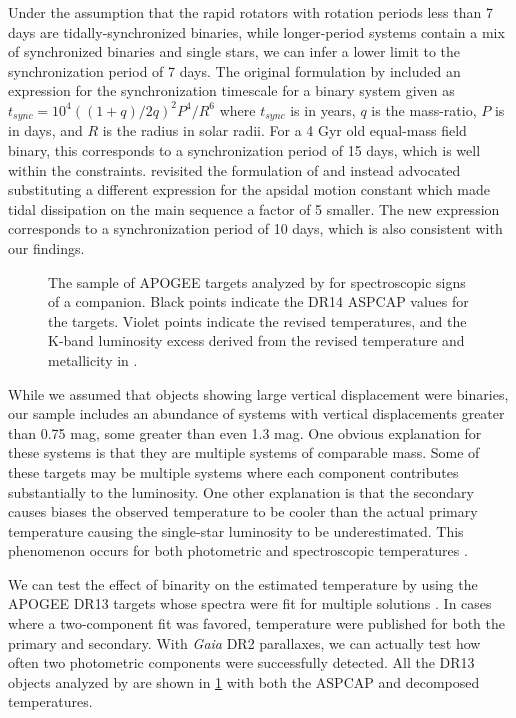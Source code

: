 \documentclass[manuscript]{aastex6}
\newcommand{\Gaia}{\mbox{\textit{Gaia}}}
\begin{document}
Under the assumption that the rapid rotators with rotation periods less than 7
days are tidally-synchronized binaries, while longer-period systems contain a
mix of synchronized binaries and single stars, we can infer a lower limit
to the synchronization period of 7 days. The original formulation by
\citep{Zahn77} included an expression for the synchronization timescale for a
binary system given as \(t_{sync} = 10^4 ((1+q)/2q)^2 P^4 / R^6\) where \(t_{sync}\) is
in years, \(q\) is the mass-ratio, \(P\) is in days, and \(R\) is the radius in
solar radii. For a 4 Gyr old equal-mass field binary, this
corresponds to a synchronization period of 15 days, which is well within the
constraints. \citet{Claret97} revisited the formulation of \citet{Zahn77} and
instead advocated substituting a different expression for the apsidal motion 
constant which made tidal dissipation on the main sequence a factor of 5
smaller. The new expression corresponds to a synchronization period of 10 days,
which is also consistent with our findings.

\begin{figure}[htb]
    \centering
    \caption{The sample of APOGEE targets analyzed by \citet{ElBadry18b} for
    spectroscopic signs of a companion. Black points indicate the DR14 ASPCAP
values for the targets. Violet points indicate the revised temperatures, and the
K-band luminosity excess derived from the revised temperature and metallicity
in \citet{ElBadry18b}.}
    \label{fig:elbadry_excess}
\end{figure}

While we assumed that objects showing large vertical displacement were
binaries, our sample includes an abundance of systems with vertical
displacements greater than 0.75 mag, some greater than even 1.3 mag. One
obvious explanation for these systems is that they are multiple systems of
comparable mass. Some of these targets may be multiple systems where each
component contributes substantially to the luminosity. One other explanation is 
that the secondary causes biases the observed temperature to be cooler than the 
actual primary temperature causing the single-star luminosity to be 
underestimated. This phenomenon occurs for both photometric and spectroscopic 
temperatures \citep{Pinsonneault12,ElBadry18a}. 

We can test the effect of binarity on the estimated temperature by using the
APOGEE DR13 targets whose spectra were fit for multiple solutions
\citep{ElBadry18b}. In cases where a two-component fit was favored, temperature
were published for both the primary and secondary. With \Gaia{} DR2 parallaxes,
we can actually test how often two photometric components were successfully
detected. All the DR13 objects analyzed by \citet{ElBadry18b} are shown in
\cref{fig:elbadry_excess} with both the ASPCAP and decomposed temperatures.
\end{document}
